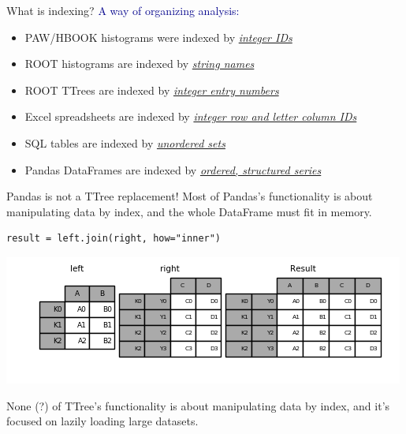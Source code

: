 \documentclass[aspectratio=169]{beamer}
\begin{document}
\begin{frame}{What is indexing?}
\large
\vspace{0.5 cm}
\textcolor{darkblue}{\Large A way of organizing analysis:}

\vspace{0.25 cm}
\begin{itemize}\setlength{\itemsep}{0.25 cm}
\item PAW/HBOOK histograms were indexed by \underline{\it integer IDs}
\item ROOT histograms are indexed by \underline{\it string names}
\item ROOT TTrees are indexed by \underline{\it integer entry numbers}
\item Excel spreadsheets are indexed by \underline{\it integer row and letter column IDs}
\item SQL tables are indexed by \underline{\it unordered sets}
\item Pandas DataFrames are indexed by \underline{\it ordered, structured series}
\end{itemize}
\end{frame}

\begin{frame}[fragile]{Pandas is not a TTree replacement!}
\large
\vspace{0.5 cm}
Most of Pandas's functionality is about manipulating data by index, and the whole DataFrame must fit in memory.

\small
\begin{verbatim}
result = left.join(right, how="inner")
\end{verbatim}
\large

\includegraphics[width=0.7\linewidth]{merging_join_multiindex_inner.png}

\vspace{0.5 cm}
None (?) of TTree's functionality is about manipulating data by index, and it's focused on lazily loading large datasets.
\end{frame}
\end{document}
